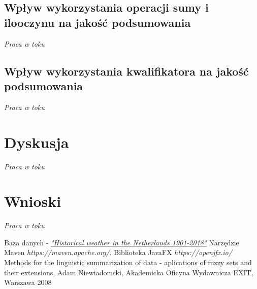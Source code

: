 \documentclass{classrep}
\begin{document}
\subsection{Wpływ wykorzystania operacji sumy i ilooczynu na jakość podsumowania}
\textit{Praca w toku}

\subsection{Wpływ wykorzystania kwalifikatora na jakość podsumowania}
\textit{Praca w toku}




\section{Dyskusja}
\textit{Praca w toku}


\section{Wnioski}
\textit{Praca w toku}


\begin{thebibliography}{2}
Baza danych - 
\href{https://www.kaggle.com/sinaasappel/historical-weather-in-the-netherlands-19012018}{\textit{"Historical weather in the Netherlands 1901-2018"}}
Narzędzie Maven\newline
\textit{https://maven.apache.org/}. 
Biblioteka JavaFX\newline
\textit{https://openjfx.io/}
Methods for the linguistic summarization of data - aplications of fuzzy sets and their extensions, Adam Niewiadomski, Akademicka Oficyna Wydawnicza EXIT, Warszawa 2008
\end{thebibliography}
\end{document}
